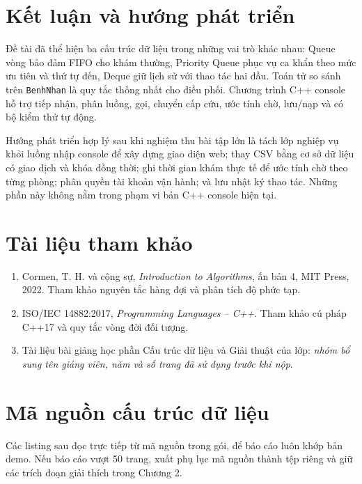 \documentclass[12pt,a4paper,oneside]{report}
\begin{document}
\chapter{Kết luận và hướng phát triển}
Đề tài đã thể hiện ba cấu trúc dữ liệu trong những vai trò khác nhau: Queue vòng bảo đảm FIFO cho khám thường, Priority Queue phục vụ ca khẩn theo mức ưu tiên và thứ tự đến, Deque giữ lịch sử với thao tác hai đầu. Toán tử so sánh trên \texttt{BenhNhan} là quy tắc thống nhất cho điều phối. Chương trình C++ console hỗ trợ tiếp nhận, phân luồng, gọi, chuyển cấp cứu, ước tính chờ, lưu/nạp và có bộ kiểm thử tự động.

Hướng phát triển hợp lý sau khi nghiệm thu bài tập lớn là tách lớp nghiệp vụ khỏi luồng nhập console để xây dựng giao diện web; thay CSV bằng cơ sở dữ liệu có giao dịch và khóa đồng thời; ghi thời gian khám thực tế để ước tính chờ theo từng phòng; phân quyền tài khoản vận hành; và lưu nhật ký thao tác. Những phần này không nằm trong phạm vi bản C++ console hiện tại.

\chapter*{Tài liệu tham khảo}
\begin{enumerate}
\item Cormen, T. H. và cộng sự, \textit{Introduction to Algorithms}, ấn bản 4, MIT Press, 2022. Tham khảo nguyên tắc hàng đợi và phân tích độ phức tạp.
\item ISO/IEC 14882:2017, \textit{Programming Languages -- C++}. Tham khảo cú pháp C++17 và quy tắc vòng đời đối tượng.
\item Tài liệu bài giảng học phần Cấu trúc dữ liệu và Giải thuật của lớp: \textit{nhóm bổ sung tên giảng viên, năm và số trang đã sử dụng trước khi nộp}.
\end{enumerate}

\appendix
\chapter{Mã nguồn cấu trúc dữ liệu}
Các listing sau đọc trực tiếp từ mã nguồn trong gói, để báo cáo luôn khớp bản demo. Nếu báo cáo vượt 50 trang, xuất phụ lục mã nguồn thành tệp riêng và giữ các trích đoạn giải thích trong Chương 2.





\end{document}
